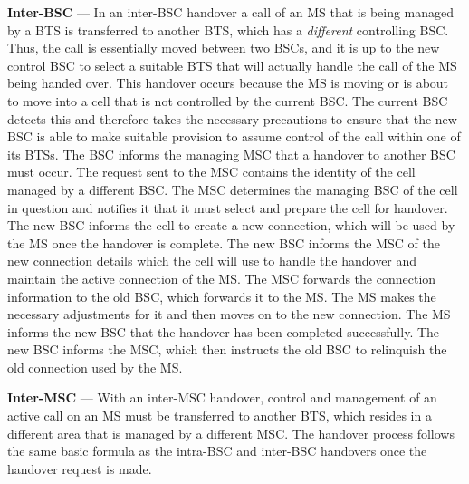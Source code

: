 \begin{description}
\item{\textbf{Inter-BSC}} --- In an inter-\gls{BSC} handover a call of an \gls{MS} that is being managed by a \gls{BTS} is transferred to another \gls{BTS}, which has a \emph{different} controlling \gls{BSC}\@. Thus, the call is essentially moved between two \glspl{BSC}, and it is up to the new control \gls{BSC} to select a suitable \gls{BTS} that will actually handle the call of the \gls{MS} being handed over\cite{wirelesstelcoMullet,GSMArchitectureProtocolsServices}.
This handover occurs because the \gls{MS} is moving or is about to move into a cell that is not controlled by the current \gls{BSC}\@. The current \gls{BSC} detects this and therefore takes the necessary precautions to ensure that the new \gls{BSC} is able to make suitable provision to assume control of the call within one of its BTSs\cite{wirelesstelcoMullet,GSMArchitectureProtocolsServices}.
The \gls{BSC} informs the managing \gls{MSC} that a handover to another \gls{BSC} must occur. The request sent to the \gls{MSC} contains the identity of the cell managed by a different BSC\@. The \gls{MSC} determines the managing \gls{BSC} of the cell in question and notifies it that it must select and prepare the cell for handover. The new \gls{BSC} informs the cell to create a new connection, which will be used by the \gls{MS} once the handover is complete\cite{wirelesstelcoMullet,GSMArchitectureProtocolsServices}.
The new \gls{BSC} informs the \gls{MSC} of the new connection details which the cell will use to handle the handover and maintain the active connection of the \gls{MS}\@\cite{wirelesstelcoMullet}. The \gls{MSC} forwards the connection information to the old \gls{BSC}, which forwards it to the \gls{MS}\@\cite{wirelesstelcoMullet}. The \gls{MS} makes the necessary adjustments for it and then moves on to the new connection. The \gls{MS} informs the new \gls{BSC} that the handover has been completed successfully\cite{wirelesstelcoMullet}. The new \gls{BSC} informs the \gls{MSC}, which then instructs the old \gls{BSC} to relinquish the old connection used by the \gls{MS}\cite{wirelesstelcoMullet,GSMArchitectureProtocolsServices}.
\item{\textbf{Inter-MSC}} --- With an inter-\gls{MSC} handover, control and management of an active call on an \gls{MS} must be transferred to another \gls{BTS}, which resides in a different area that is managed by a different MSC\@\cite{wirelesstelcoMullet}. The handover process follows the same basic formula as the intra-\gls{BSC} and inter-\gls{BSC} handovers once the handover request is made\cite{wirelesstelcoMullet,GSMArchitectureProtocolsServices}.

\end{description}

